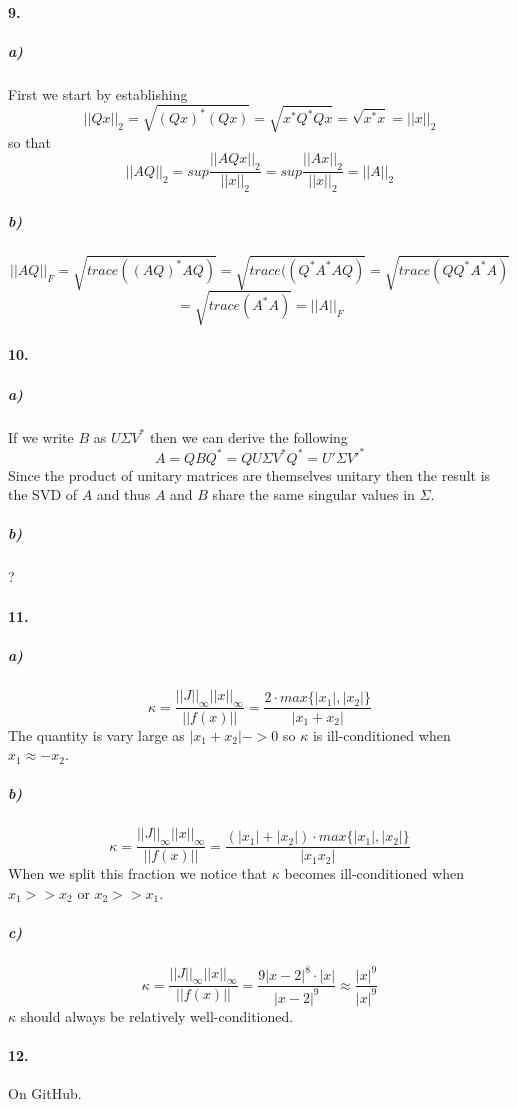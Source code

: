 \documentclass[12pt]{article}
\begin{document}
\paragraph{9.}
	\subparagraph{a)}
		First we start by establishing 
		\[
		||Qx||_2 = \sqrt{(Qx)^*(Qx)} = \sqrt{x^*Q^*Qx} = \sqrt{x^*x} = ||x||_2
		\]
		so that
		\[
		||AQ||_2 = sup \frac{||AQx||_2}{||x||_2} = sup \frac{||Ax||_2}{||x||_2} = ||A||_2
		\]
	
	\subparagraph{b)}
		\[
		||AQ||_F = \sqrt{trace((AQ)^*AQ)} = \sqrt{trace((Q^*A^*AQ)} = \sqrt{trace(QQ^*A^*A)}
		\]\[
		= \sqrt{trace(A^*A)} = ||A||_F
		\]

\paragraph{10.}
	\subparagraph{a)}
		If we write $B$ as $U\Sigma V^*$ then we can derive the following
		\[
		A = QBQ^* = QU\Sigma V^*Q^* = U'\Sigma V'^*
		\]
		Since the product of unitary matrices are themselves unitary then the result is the SVD of $A$ and thus $A$ and $B$ share the same singular values in $\Sigma$.
		
	\subparagraph{b)}
		?
		

\paragraph{11.}
	\subparagraph{a)}
		\[
		\kappa = \frac{||J||_{\infty}||x||_{\infty}}{||f(x)||} = \frac{2\cdot max\{|x_1|,|x_2|\}}{|x_1 + x_2|}
		\]
		The quantity is vary large as $|x_1 + x_2| -> 0$ so $\kappa$ is ill-conditioned when $x_1 \approx -x_2$. 
	
	\subparagraph{b)}
		\[
		\kappa = \frac{||J||_{\infty}||x||_{\infty}}{||f(x)||} = \frac{(|x_1|+|x_2|) \cdot max\{|x_1|,|x_2|\}}{|x_1x_2|}
		\]
		When we split this fraction we notice that $\kappa$ becomes ill-conditioned when $x_1 >> x_2$ or $x_2 >> x_1$.

	\subparagraph{c)}
		\[
		\kappa = \frac{||J||_{\infty}||x||_{\infty}}{||f(x)||} = \frac{9|x-2|^8 \cdot |x|}{|x-2|^9} \approx \frac{|x|^9}{|x|^9}
		\]
		$\kappa$ should always be relatively well-conditioned. 
	
	
\paragraph{12.}
	On GitHub.
\end{document}
